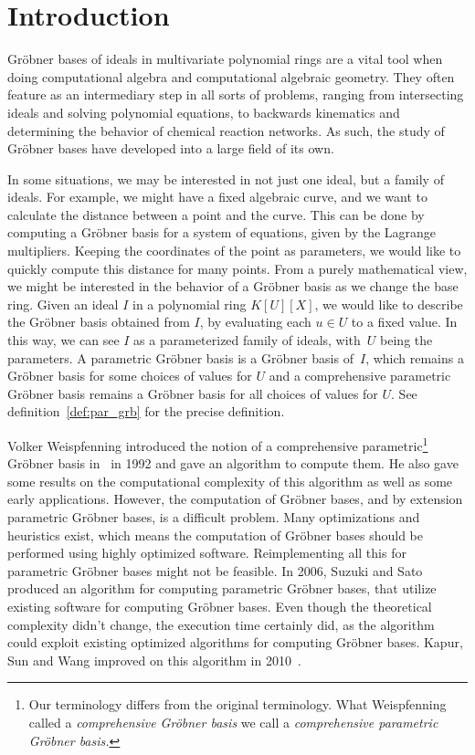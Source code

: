 \section*{Introduction}
Gröbner bases of ideals in multivariate polynomial rings are a vital tool when doing computational algebra and computational algebraic geometry. They often feature as an intermediary step in all sorts of problems, ranging from intersecting ideals and solving polynomial equations, to backwards kinematics and determining the behavior of chemical reaction networks\cite{IVA}. As such, the study of Gröbner bases have developed into a large field of its own.

In some situations, we may be interested in not just one ideal, but a family of ideals. For example, we might have a fixed algebraic curve, and we want to calculate the distance between a point and the curve. This can be done by computing a Gröbner basis for a system of equations, given by the Lagrange multipliers. Keeping the coordinates of the point as parameters, we would like to quickly compute this distance for many points. From a purely mathematical view, we might be interested in the behavior of a Gröbner basis as we change the base ring. Given an ideal $I$ in a polynomial ring $K[U][X]$, we would like to describe the Gröbner basis obtained from $I$, by evaluating each $u \in U$ to a fixed value. In this way, we can see $I$ as a parameterized family of ideals, with $\,U$ being the parameters. A parametric Gröbner basis is a Gröbner basis of $\,I$, which remains a Gröbner basis for some choices of values for $U$ and a comprehensive parametric Gröbner basis remains a Gröbner basis for all choices of values for $U$. See definition~\ref{def:par_grb} for the precise definition.

Volker Weispfenning introduced the notion of a comprehensive parametric\footnote{Our terminology differs from the original terminology. What Weispfenning called a \textit{comprehensive Gröbner basis} we call a \textit{comprehensive parametric Gröbner basis.}} Gröbner basis in~\cite{Weispfenning} in 1992 and gave an algorithm to compute them. He also gave some results on the computational complexity of this algorithm as well as some early applications. However, the computation of Gröbner bases, and by extension parametric Gröbner bases, is a difficult problem. Many optimizations and heuristics exist, which means the computation of Gröbner bases should be performed using highly optimized software. Reimplementing all this for parametric Gröbner bases might not be feasible. In 2006, Suzuki and Sato produced an algorithm for computing parametric Gröbner bases, that utilize existing software for computing Gröbner bases. Even though the theoretical complexity didn't change, the execution time certainly did, as the algorithm could exploit existing optimized algorithms for computing Gröbner bases. Kapur, Sun and Wang improved on this algorithm in 2010~\cite{KAPUR201327}\cite{10.1145/1837934.1837946}.

